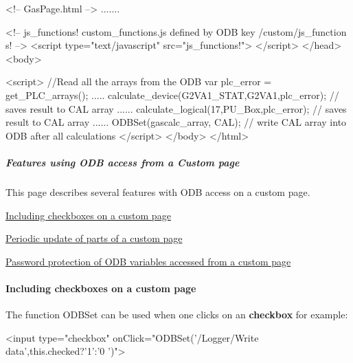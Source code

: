 \begin{DoxyCode}
<!-- GasPage.html -->
.......

<!-- js_functions!   custom_functions.js defined by  ODB key  /custom/js_function
      s!  -->
\htmlonly <script type="text/javascript"  src="js_functions!">
</script> \endhtmlonly
</head><body>


\htmlonly <script>
//Read all the arrays from the ODB
var plc_error = get_PLC_arrays();
.....
calculate_device(G2VA1_STAT,G2VA1,plc_error); // saves result to CAL array
......
calculate_logical(17,PU_Box,plc_error); // saves result to CAL array
......
ODBSet(gascalc_array, CAL); // write CAL array into ODB after all calculations
</script> \endhtmlonly
</body>
</html>
\end{DoxyCode}




\par
 \label{index_end}
\hypertarget{index_end}{}
 \subparagraph{Features using ODB access from a Custom page}\label{RC_mhttpd_custom_ODB_access_features}
\par




\par
 This page describes several features with ODB access on a custom page.


\begin{DoxyItemize}
\item \hyperlink{RC_mhttpd_custom_ODB_access_features_RC_mhttpd_custom_checkboxes}{Including checkboxes on a custom page}
\item \hyperlink{RC_mhttpd_custom_ODB_access_features_RC_mhttpd_js_update_part}{Periodic update of parts of a custom page}
\item \hyperlink{RC_mhttpd_custom_ODB_access_features_RC_mhttpd_custom_pw_protection}{Password protection of ODB variables accessed from a custom page}
\end{DoxyItemize}\hypertarget{RC_mhttpd_custom_ODB_access_features_RC_mhttpd_custom_checkboxes}{}\paragraph{Including checkboxes on a custom page}\label{RC_mhttpd_custom_ODB_access_features_RC_mhttpd_custom_checkboxes}
The function ODBSet can be used when one clicks on an {\bfseries checkbox} for example: 
\begin{DoxyCode}
  <input type="checkbox" onClick="ODBSet('/Logger/Write data',this.checked?'1':'0
      ')">
\end{DoxyCode}


